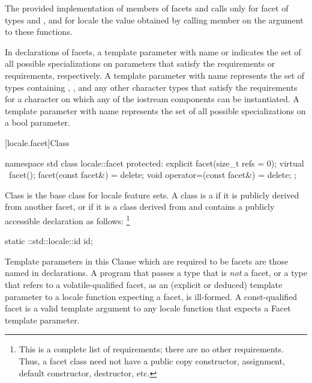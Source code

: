 \pnum
The provided implementation of members of facets
and
calls
only for facet
of types
and
,
and for locale
the value obtained
by calling member
on the
argument to these functions.

\pnum
In declarations of facets, a template parameter with name
or
indicates the set of
all possible specializations on parameters that satisfy the
 requirements or 
requirements, respectively.
A template parameter with name
represents the set
of types containing , , and any other
character types that satisfy
the requirements for a character on which any of the iostream
components can be instantiated.
A template parameter with name
represents the set of all possible specializations on a bool parameter.

[locale.facet]{Class }

%
\begin{codeblock}
namespace std {
  class locale::facet {
  protected:
    explicit facet(size_t refs = 0);
    virtual ~facet();
    facet(const facet&) = delete;
    void operator=(const facet&) = delete;
  };
}
\end{codeblock}

\pnum
Class  is the base class for locale feature sets.
A class is a 
if it is publicly derived from another facet, or
if it is a class derived from  and
contains a publicly accessible declaration as follows:%
\footnote{This is a complete list of requirements; there are no other requirements.
Thus, a facet class need not have a public
copy constructor, assignment, default constructor, destructor, etc.}
\begin{codeblock}
static ::std::locale::id id;
\end{codeblock}

\pnum
Template parameters in this Clause which are required to be facets are those named
in declarations.
A program that passes a type that is
\textit{not}
a facet, or a type that refers to a volatile-qualified facet, as an
(explicit or deduced) template parameter to a locale
function expecting a facet, is ill-formed. A const-qualified facet is a
valid template argument to any locale function that expects a Facet template
parameter.

